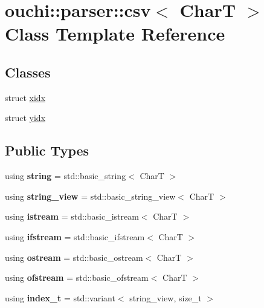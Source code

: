 \hypertarget{classouchi_1_1parser_1_1csv}{}\section{ouchi\+::parser\+::csv$<$ CharT $>$ Class Template Reference}
\label{classouchi_1_1parser_1_1csv}
\subsection*{Classes}
\begin{DoxyCompactItemize}
\item 
struct \mbox{\hyperlink{structouchi_1_1parser_1_1csv_1_1xidx}{xidx}}
\item 
struct \mbox{\hyperlink{structouchi_1_1parser_1_1csv_1_1yidx}{yidx}}
\end{DoxyCompactItemize}
\subsection*{Public Types}
\begin{DoxyCompactItemize}
\item 
\mbox{\label{classouchi_1_1parser_1_1csv_a8008603a25246477429da64c39c6f99c}} 
using {\bfseries string} = std\+::basic\+\_\+string$<$ CharT $>$
\item 
\mbox{\label{classouchi_1_1parser_1_1csv_a04e08d70111909af14bb362407a291be}} 
using {\bfseries string\+\_\+view} = std\+::basic\+\_\+string\+\_\+view$<$ CharT $>$
\item 
\mbox{\label{classouchi_1_1parser_1_1csv_a4798e738a6dcf91b621fb513f63075d3}} 
using {\bfseries istream} = std\+::basic\+\_\+istream$<$ CharT $>$
\item 
\mbox{\label{classouchi_1_1parser_1_1csv_ac6cbbfb0fb5d274ec87e16b469b7556b}} 
using {\bfseries ifstream} = std\+::basic\+\_\+ifstream$<$ CharT $>$
\item 
\mbox{\label{classouchi_1_1parser_1_1csv_adefd71e1aeaedc0de2e62b8780c4118f}} 
using {\bfseries ostream} = std\+::basic\+\_\+ostream$<$ CharT $>$
\item 
\mbox{\label{classouchi_1_1parser_1_1csv_a77210c7dcb3a3258c41d37a5701cc0ff}} 
using {\bfseries ofstream} = std\+::basic\+\_\+ofstream$<$ CharT $>$
\item 
\mbox{\label{classouchi_1_1parser_1_1csv_a2c6125bcebc3321754974e477651f46e}} 
using {\bfseries index\+\_\+t} = std\+::variant$<$ string\+\_\+view, size\+\_\+t $>$
\end{DoxyCompactItemize}
